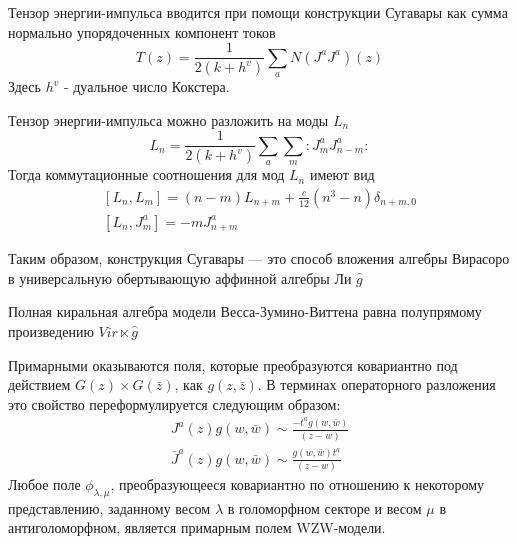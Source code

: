 \documentclass[a4paper,12pt]{article}
\theoremstyle{definition} \newtheorem{Def}{Definition}
\begin{document}
Тензор энергии-импульса вводится при помощи конструкции Сугавары как сумма нормально упорядоченных компонент токов
\begin{equation}
  \label{eq:102}
  T(z)=\frac{1}{2(k+h^v)}\sum_a N(J^a J^a)(z)
\end{equation}
Здесь $h^v$ - дуальное число Кокстера.

Тензор энергии-импульса можно разложить на моды $L_n$
\begin{equation}
  \label{eq:91}
  L_n=\frac{1}{2(k+h^v)}\sum_a\sum_m:J^a_m J^a_{n-m}:
\end{equation}
Тогда коммутационные соотношения для мод $L_n$ имеют вид
\begin{equation}
  \label{eq:92}
  \begin{aligned}
    \left[L_n,L_m\right]=(n-m)L_{n+m}+\frac{c}{12}(n^3-n)\delta_{n+m,0}\\
    \left[L_n,J^a_m\right]=-mJ^a_{n+m}
  \end{aligned}
\end{equation}

Таким образом, конструкция Сугавары --- это способ вложения алгебры Вирасоро в универсальную обертывающую аффинной алгебры Ли $\hat{g}$

Полная киральная алгебра модели Весса-Зумино-Виттена равна полупрямому произведению $Vir\ltimes \hat g$

Примарными оказываются поля, которые преобразуются ковариантно под действием $G(z)\times G(\bar z)$,
как $g(z,\bar z)$. В терминах операторного разложения это свойство переформулируется следующим
образом:
\begin{equation}
  \label{eq:84}
  \begin{aligned}
    J^a(z)g(w,\bar w)\sim \frac{-t^a g(w,\bar w)}{(z-w)}\\
    \bar J^a(z)g(w,\bar w)\sim \frac{ g(w,\bar w)t^a}{(z-w)}
  \end{aligned}
\end{equation}
Любое поле $\phi_{\lambda,\mu}$, преобразующееся ковариантно по отношению к некоторому
представлению, заданному весом $\lambda$ в голоморфном секторе и весом $\mu$ в антиголоморфном,
является примарным полем WZW-модели.
\end{document}
